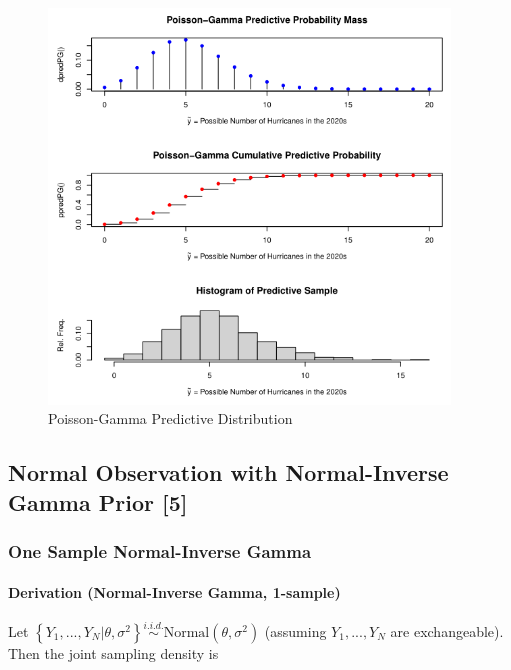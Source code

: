 \documentclass[12pt, a4paper]{article}
\begin{document}
\begin{figure}[ht]
  \centering
  \includegraphics[width=0.95\textwidth]{./Graphics/DistributionPlots/PoissonGamma}
  \caption{Poisson-Gamma Predictive Distribution}
  \label{fig:PGdist}
\end{figure}

\vspace{2cm}





\clearpage

  \subsection{Normal Observation with Normal-Inverse Gamma Prior [5]}

    \subsubsection{One Sample Normal-Inverse Gamma}
      \paragraph{Derivation (Normal-Inverse Gamma, 1-sample)}

\noindent Let $\left\{Y_1,...,Y_N|\theta,\sigma^2\right\}\overset{i.i.d.}{\sim}\text{Normal}\left(\theta,\sigma^2\right)$ (assuming $Y_1,...,Y_N$ are exchangeable).  Then the joint sampling density is
\end{document}
